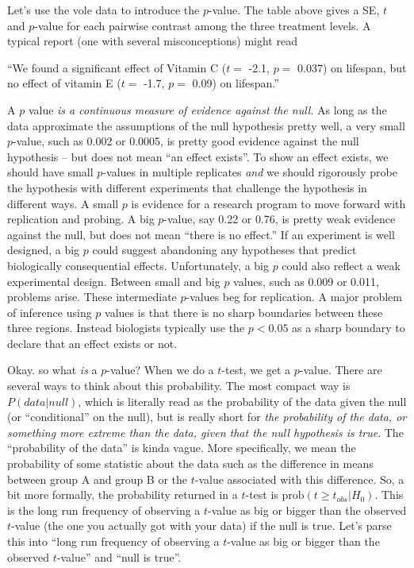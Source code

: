 \documentclass[]{book}
\theoremstyle{definition}
\theoremstyle{definition}
\theoremstyle{definition}
\theoremstyle{remark}
\begin{document}
Let's use the vole data to introduce the \(p\)-value. The table above
gives a SE, \(t\) and \(p\)-value for each pairwise contrast among the
three treatment levels. A typical report (one with several
misconceptions) might read

``We found a significant effect of Vitamin C (\(t=\) -2.1, \(p=\) 0.037)
on lifespan, but no effect of vitamin E (\(t=\) -1.7, \(p=\) 0.09) on
lifespan.''

A \(p\) value \emph{is a continuous measure of evidence against the
null}. As long as the data approximate the assumptions of the null
hypothesis pretty well, a very small \(p\)-value, such as 0.002 or
0.0005, is pretty good evidence against the null hypothesis -- but does
not mean ``an effect exists''. To show an effect exists, we should have
small \(p\)-values in multiple replicates \emph{and} we should
rigorously probe the hypothesis with different experiments that
challenge the hypothesis in different ways. A small \(p\) is evidence
for a research program to move forward with replication and probing. A
big \(p\)-value, say 0.22 or 0.76, is pretty weak evidence against the
null, but does not mean ``there is no effect.'' If an experiment is well
designed, a big \(p\) could suggest abandoning any hypotheses that
predict biologically consequential effects. Unfortunately, a big \(p\)
could also reflect a weak experimental design. Between small and big
\(p\) values, such as 0.009 or 0.011, problems arise. These intermediate
\(p\)-values beg for replication. A major problem of inference using
\(p\) values is that there is no sharp boundaries between these three
regions. Instead biologists typically use the \(p < 0.05\) as a sharp
boundary to declare that an effect exists or not.

Okay. so what \emph{is} a \(p\)-value? When we do a \(t\)-test, we get a
\(p\)-value. There are several ways to think about this probability. The
most compact way is \(P(data | null)\), which is literally read as the
probability of the data given the null (or ``conditional'' on the null),
but is really short for \emph{the probability of the data, or something
more extreme than the data, given that the null hypothesis is true}. The
``probability of the data'' is kinda vague. More specifically, we mean
the probability of some statistic about the data such as the difference
in means between group A and group B or the \(t\)-value associated with
this difference. So, a bit more formally, the probability returned in a
\(t\)-test is \(\mathrm{prob}(t \ge t_{obs} | H_0)\). This is the long
run frequency of observing a \(t\)-value as big or bigger than the
observed \(t\)-value (the one you actually got with your data) if the
null is true. Let's parse this into ``long run frequency of observing a
\(t\)-value as big or bigger than the observed \(t\)-value'' and ``null
is true''.
\end{document}

